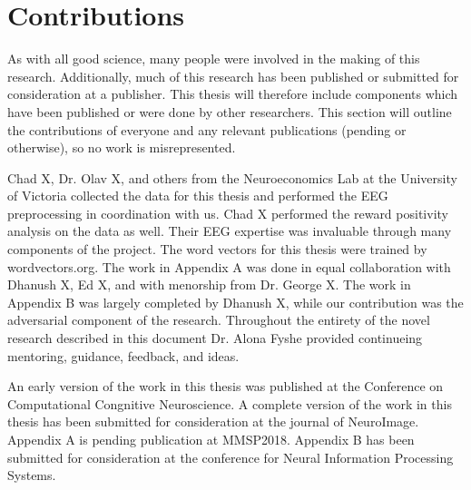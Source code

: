 \section{Contributions}

As with all good science, many people were involved in the making of this 
research. Additionally, much of this research has been published or submitted 
for consideration at a publisher. This thesis will therefore include components 
which have been published or were done by other researchers. This section will 
outline the contributions of everyone and any relevant publications (pending or 
otherwise), so no work is misrepresented.

Chad X, Dr. Olav X, and others from the Neuroeconomics Lab at the University of 
Victoria collected the data for this thesis and performed the EEG preprocessing 
in coordination with us. Chad X performed the reward positivity analysis on the 
data as well. Their EEG expertise was invaluable through many components of the 
project. The word vectors for this thesis were trained by wordvectors.org. The 
work in Appendix A was done in equal collaboration with Dhanush X, Ed X, and 
with menorship from Dr. George X. The work in Appendix B was largely completed 
by Dhanush X, while our contribution was the adversarial component of the 
research. Throughout the entirety of the novel research described in this 
document Dr. Alona Fyshe provided continueing mentoring, guidance, feedback, 
and ideas.

An early version of the work in this thesis was published at the Conference on 
Computational Congnitive Neuroscience. A complete version of the work in this 
thesis has been submitted for consideration at the journal of NeuroImage.  
Appendix A is pending publication at MMSP2018. Appendix B has been submitted 
for consideration at the conference for Neural Information Processing Systems.
